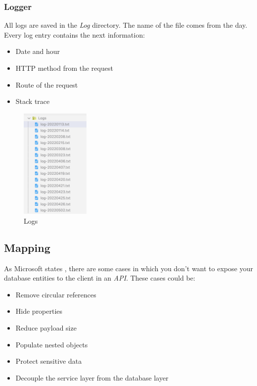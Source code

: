         \subsubsection{Logger}
        All logs are saved in the \textit{Log} directory. The name of the file comes from the day. Every log entry contains the next information:
        \begin{itemize}[noitemsep]
            \item Date and hour
            \item HTTP method from the request
            \item Route of the request
            \item Stack trace
        \end{itemize}
        \begin{figure}[H]
            \centering
                \includegraphics[width=0.3\textwidth]{assets/logs.png}
            \caption{Logs}
            \label{fig:implementation_logs}
        \end{figure}
        
    \subsection{Mapping}
        As Microsoft states \cite{DTO}, there are some cases in which you don't want to expose your database entities to the client in an \textit{API}. These cases could be:
        \begin{itemize}[noitemsep]
            \item Remove circular references
            \item Hide properties 
            \item Reduce payload size
            \item Populate nested objects 
            \item Protect sensitive data
            \item Decouple the service layer from the database layer
        \end{itemize}

